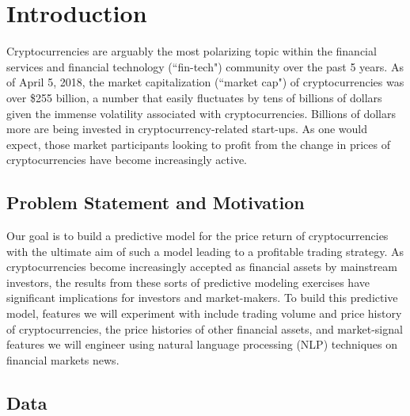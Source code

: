 \documentclass[12pt,twoside]{article}
\begin{document}
\newpage
\tableofcontents
\newpage
\setlength{\parindent}{0cm}

\section{Introduction}

Cryptocurrencies are arguably the most polarizing topic within the financial services and financial technology (``fin-tech") community over the past 5 years. As of April 5, 2018, the market capitalization (``market cap") of cryptocurrencies was over \$255 billion, a number that easily fluctuates by tens of billions of dollars given the immense volatility associated with cryptocurrencies. Billions of dollars more are being invested in cryptocurrency-related start-ups. As one would expect, those market participants looking to profit from the change in prices of cryptocurrencies have become increasingly active.

\subsection{Problem Statement and Motivation}

Our goal is to build a predictive model for the price return of cryptocurrencies with the ultimate aim of such a model leading to a profitable trading strategy. As cryptocurrencies become increasingly accepted as financial assets by mainstream investors, the results from these sorts of predictive modeling exercises have significant implications for investors and market-makers. To build this predictive model, features we will experiment with include trading volume and price history of cryptocurrencies, the price histories of other financial assets, and market-signal features we will engineer using natural language processing (NLP) techniques on financial markets news.

\subsection{Data}
\end{document}
